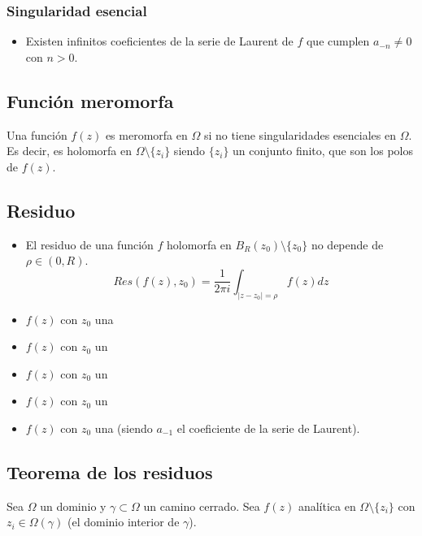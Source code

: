 \documentclass[paper=a4, fontsize=11pt]{scrartcl}
\numberwithin{equation}{section}
\numberwithin{figure}{section}
\numberwithin{table}{section}
\begin{document}
\subsubsection{Singularidad esencial}
\begin{itemize}
\item Existen infinitos coeficientes de la serie de Laurent de $f$ que cumplen $a_{-n}\neq 0$ con $n>0$.
\end{itemize}

\subsection{Función meromorfa}
Una función $f(z)$ es meromorfa en $\Omega$ si no tiene singularidades esenciales en $\Omega$. Es decir, es holomorfa en $\Omega\setminus\{z_i\}$ siendo $\{z_i\}$ un conjunto finito, que son los polos de $f(z)$.

\subsection{Residuo}
\begin{itemize}
\item El residuo de una función $f$ holomorfa en $B_R(z_0)\setminus\{z_0\}$ no depende de $\rho\in(0,R)$.
$$\boxed{Res(f(z), z_0) = \frac{1}{2\pi i}\int_{|z-z_0|=\rho} f(z)dz}$$

\item $f(z)$ con $z_0$ una 
\item $f(z)$ con $z_0$ un 
\item $f(z)$ con $z_0$ un 
\item $f(z)$ con $z_0$ un 
\item $f(z)$ con $z_0$ una  (siendo $a_{-1}$ el coeficiente de la serie de Laurent).
\end{itemize}

\subsection{Teorema de los residuos}
Sea $\Omega$ un dominio y $\gamma\subset\Omega$ un camino cerrado. Sea $f(z)$ analítica en $\Omega\setminus\{z_i\}$ con $z_i\in\Omega(\gamma)$ (el dominio interior de $\gamma$).
\end{document}
